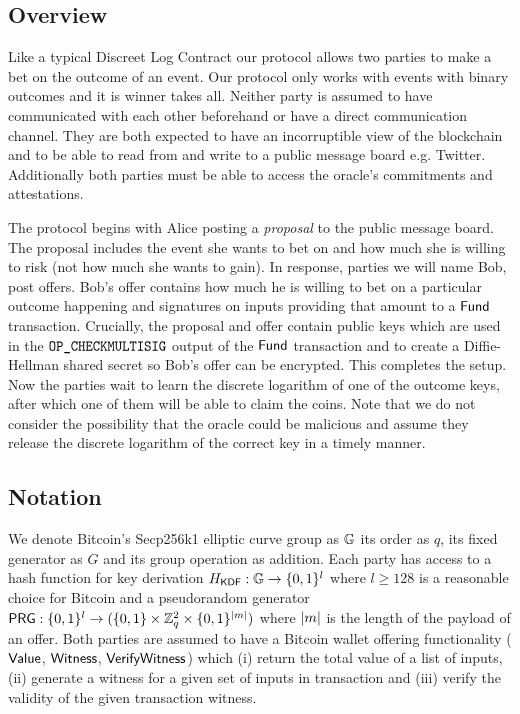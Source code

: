 \documentclass[runningheads]{llncs}
\begin{document}
\subsection{Overview}

Like a typical Discreet Log Contract our protocol allows two parties to make a bet on the outcome of an event. Our protocol only works with events with binary outcomes and it is winner takes all. Neither party is assumed to have communicated with each other beforehand or have a direct communication channel. They are both expected to have an incorruptible view of the blockchain and to be able to read from and write to a public message board e.g. Twitter. Additionally both parties must be able to access the oracle's commitments and attestations.

The protocol begins with Alice posting a \emph{proposal} to the public message board. The proposal includes the event she wants to bet on and how much she is willing to risk (not how much she wants to gain).
In response, parties we will name Bob, post offers. Bob's offer contains how much he is willing to bet on a particular outcome happening and signatures on inputs providing that amount to a $\textsf{Fund}$ transaction.
Crucially, the proposal and offer contain public keys which are used in the $\texttt{OP\_CHECKMULTISIG}$ output of the $\textsf{Fund}$ transaction and to create a Diffie-Hellman shared secret so Bob's offer can be encrypted.
This completes the setup.
Now the parties wait to learn the discrete logarithm of one of the outcome keys, after which one of them will be able to claim the coins. Note that we do not consider the possibility that the oracle could be malicious and assume they release the discrete logarithm of the correct key in a timely manner.

\subsection{Notation}

We denote Bitcoin's Secp256k1 elliptic curve group as $\mathbb{G}$ its order as $q$, its fixed generator as $G$ and its group operation as addition.
Each party has access to a hash function for key derivation $H_{\textsf{KDF}}:\mathbb{G}\to\{0,1\}^{l}$ where $l \geq 128$ is a reasonable choice for Bitcoin and a pseudorandom generator $\textsf{PRG}:\{0,1\}^l\to(\{0,1\} \times \mathbb{Z}_q^2 \times \{0,1\}^{\left\lvert m \right\rvert})$ where $\left\lvert m \right\rvert$ is the length of the payload of an offer.
Both parties are assumed to have a Bitcoin wallet offering functionality ($\textsf{Value}$, $\textsf{Witness}$, $\textsf{VerifyWitness}$) which (i) return the total value of a list of inputs, (ii) generate a witness for a given set of inputs in transaction and (iii) verify the validity of the given transaction witness.
\end{document}
